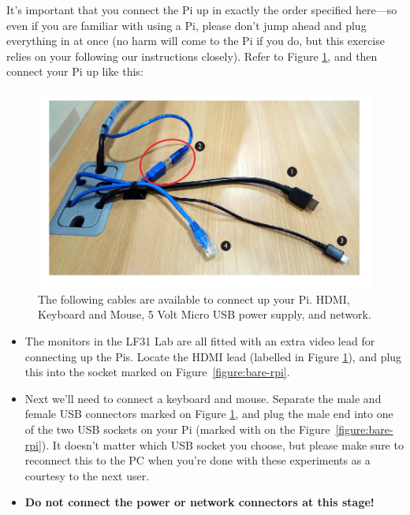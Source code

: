 It's important that you connect the Pi up in exactly the order specified here---so even if you are familiar with using a Pi, please don't jump ahead and plug everything in at once (no harm will come to the Pi if you do, but this exercise relies on your following our instructions closely). Refer to Figure \ref{figure:cables}, and then connect your Pi up like this:

\begin{figure}
\centerline{\includegraphics[width=13cm]{images/cables}}
\caption{The following cables are available to connect up your Pi. \protect{} HDMI, \protect{} Keyboard and Mouse, \protect{} 5 Volt Micro USB power supply, and \protect{} network.}\label{figure:cables}
\end{figure}


\begin{itemize}
\item The monitors in the LF31 Lab are all fitted with an extra video lead for connecting up the Pis. Locate the HDMI lead (labelled \protect{} in Figure \ref{figure:cables}), and plug this into the socket marked  on Figure~\ref{figure:bare-rpi}.
\item Next we'll need to connect a keyboard and mouse. Separate the male and female USB connectors marked \protect{} on Figure \ref{figure:cables}, and plug the male end into one of the two USB sockets on your Pi (marked with \protect{} on the Figure~\ref{figure:bare-rpi}). It doesn't matter which USB socket you choose, but please make sure to reconnect this to the PC when you're done with these experiments as a courtesy to the next user.
\item \textbf{Do not connect the power or network connectors at this stage!}
\end{itemize}

